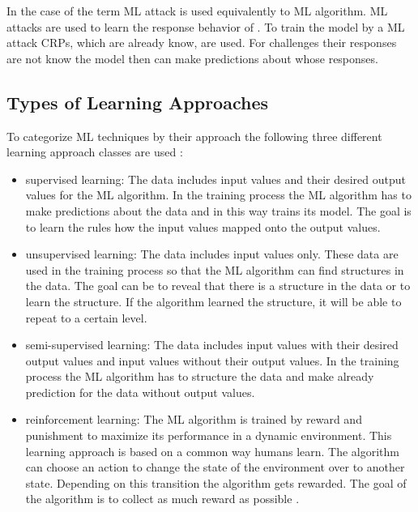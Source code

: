 In the case of \pufs the term \ac{ML} attack is used equivalently to \ac{ML} algorithm.
\ac{ML} attacks are used to learn the response behavior of \pufs. %
To train the model by a \ac{ML} attack \acp{CRP}, which are already know, are used.
For challenges their responses are not know the model then can make predictions about whose responses.


\subsection{Types of Learning Approaches}

To categorize \ac{ML} techniques by their approach the following three different learning approach classes are used \cite{Wikipedia2017MachineLearning}:

\begin{itemize}
\item supervised learning: The data includes input values and their desired output values for the \ac{ML} algorithm. 
In the training process the \ac{ML} algorithm has to make predictions about the data and in this way trains its model. %
The goal is to learn the rules how the input values mapped onto the output values.
\item unsupervised learning: The data includes input values only.
These data are used in the training process so that the \ac{ML} algorithm can find structures in the data. %
The goal can be to reveal that there is a structure in the data or to learn the structure.
If the algorithm learned the structure, it will be able to repeat to a certain level.
\item semi-supervised learning: The data includes input values with their desired output values and input values without their output values. %
In the training process the \ac{ML} algorithm has to structure the data and make already prediction for the data without output values.
\item reinforcement learning: The \ac{ML} algorithm is trained by reward and punishment to maximize its performance in a dynamic environment.
This learning approach is based on a common way humans learn. %
The algorithm can choose an action to change the state of the environment over to another state.
Depending on this transition the algorithm gets rewarded.
The goal of the algorithm is to collect as much reward as possible \cite{Wikipedia2017ReinforcementLearning}.
\end{itemize}

